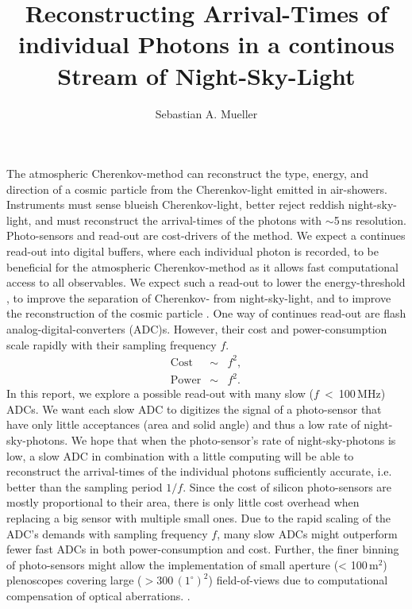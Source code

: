 \documentclass{article}%
\title{
    Reconstructing Arrival-Times of individual Photons
    in a continous Stream of Night-Sky-Light
}%
\author{Sebastian A. Mueller}%
\date{}%
\begin{document}
%
\maketitle%

\newcommand{\F}{F_\text{nsb}}
\newcommand{\Ftyp}{F_\text{typical}}
\begin{multicols}{2}%
%
The atmospheric Cherenkov-method can reconstruct the type, energy, and direction of a cosmic particle from the Cherenkov-light emitted in air-showers.
%
Instruments must sense blueish Cherenkov-light, better reject reddish night-sky-light, and must reconstruct the arrival-times of the photons with $\sim{}$5\,ns resolution.
%
Photo-sensors and read-out are cost-drivers of the method.
\newline
%
We expect a continues read-out into digital buffers, where each individual photon is recorded, to be beneficial for the atmospheric Cherenkov-method as it allows fast computational access to all observables.
%
We expect such a read-out to lower the energy-threshold \cite{jung2005star}, to improve the separation of Cherenkov- from night-sky-light, and to improve the reconstruction of the cosmic particle \cite{catalano2008single}.
\newline
%
One way of continues read-out are flash analog-digital-converters (ADC)s.
%
However, their cost and power-consumption scale rapidly with their sampling frequency $f$.
%
\begin{eqnarray*}
\text{Cost} &\sim& f^2,\\
\text{Power} &\sim& f^2.
\end{eqnarray*}
%
In this report, we explore a possible read-out with many slow \mbox{($f$ < 100\,MHz)} ADCs.
%
We want each slow ADC to digitizes the signal of a photo-sensor that have only little acceptances (area and solid angle) and thus a low rate of night-sky-photons.
%
We hope that when the photo-sensor's rate of night-sky-photons is low, a slow ADC in combination with a little computing will be able to reconstruct the arrival-times of the individual photons sufficiently accurate, i.e. better than the sampling period $1/f$.
%
Since the cost of silicon photo-sensors are mostly proportional to their area, there is only little cost overhead when replacing a big sensor with multiple small ones.
%
Due to the rapid scaling of the ADC's demands with sampling frequency $f$, many slow ADCs might outperform fewer fast ADCs in both power-consumption and cost.
\newline
Further, the finer binning of photo-sensors might allow the implementation of small aperture (< 100\,m$^2$) plenoscopes covering large ($> 300\,(1^\circ{})^2$) field-of-views due to computational compensation of optical aberrations. \cite{mueller2019phd}.
%

\end{multicols}
\end{document}
